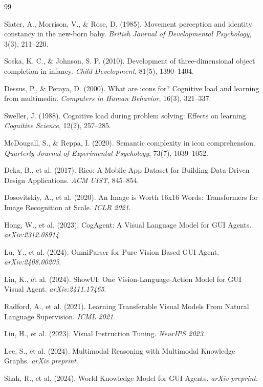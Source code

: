 \documentclass[11pt]{article}
\begin{document}
\begin{thebibliography}{99}

Slater, A., Morrison, V., \& Rose, D. (1985).
Movement perception and identity constancy in the new-born baby.
\textit{British Journal of Developmental Psychology}, 3(3), 211--220.

Soska, K. C., \& Johnson, S. P. (2010).
Development of three-dimensional object completion in infancy.
\textit{Child Development}, 81(5), 1390--1404.

Dessus, P., \& Peraya, D. (2000).
What are icons for? Cognitive load and learning from multimedia.
\textit{Computers in Human Behavior}, 16(3), 321--337.

Sweller, J. (1988).
Cognitive load during problem solving: Effects on learning.
\textit{Cognitive Science}, 12(2), 257--285.

McDougall, S., \& Reppa, I. (2020).
Semantic complexity in icon comprehension.
\textit{Quarterly Journal of Experimental Psychology}, 73(7), 1039--1052.

Deka, B., et al. (2017).
Rico: A Mobile App Dataset for Building Data-Driven Design Applications.
\textit{ACM UIST}, 845--854.

Dosovitskiy, A., et al. (2020).
An Image is Worth 16x16 Words: Transformers for Image Recognition at Scale.
\textit{ICLR 2021}.

Hong, W., et al. (2023).
CogAgent: A Visual Language Model for GUI Agents.
\textit{arXiv:2312.08914}.

Lu, Y., et al. (2024).
OmniParser for Pure Vision Based GUI Agent.
\textit{arXiv:2408.00203}.

Lin, K., et al. (2024).
ShowUI: One Vision-Language-Action Model for GUI Visual Agent.
\textit{arXiv:2411.17465}.

Radford, A., et al. (2021).
Learning Transferable Visual Models From Natural Language Supervision.
\textit{ICML 2021}.

Liu, H., et al. (2023).
Visual Instruction Tuning.
\textit{NeurIPS 2023}.

Lee, S., et al. (2024).
Multimodal Reasoning with Multimodal Knowledge Graphs.
\textit{arXiv preprint}.

Shah, R., et al. (2024).
World Knowledge Model for GUI Agents.
\textit{arXiv preprint}.


\end{thebibliography}
\end{document}
